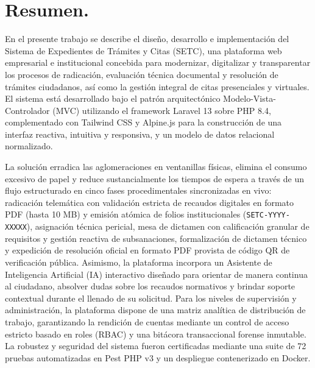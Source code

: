 \section*{Resumen.}

En el presente trabajo se describe el diseño, desarrollo e implementación del Sistema de Expedientes de Trámites y Citas (SETC), una plataforma web empresarial e institucional concebida para modernizar, digitalizar y transparentar los procesos de radicación, evaluación técnica documental y resolución de trámites ciudadanos, así como la gestión integral de citas presenciales y virtuales. El sistema está desarrollado bajo el patrón arquitectónico Modelo-Vista-Controlador (MVC) utilizando el framework Laravel 13 sobre PHP 8.4, complementado con Tailwind CSS y Alpine.js para la construcción de una interfaz reactiva, intuitiva y responsiva, y un modelo de datos relacional normalizado.

La solución erradica las aglomeraciones en ventanillas físicas, elimina el consumo excesivo de papel y reduce sustancialmente los tiempos de espera a través de un flujo estructurado en cinco fases procedimentales sincronizadas en vivo: radicación telemática con validación estricta de recaudos digitales en formato PDF (hasta 10 MB) y emisión atómica de folios institucionales (\texttt{SETC-YYYY-XXXXX}), asignación técnica pericial, mesa de dictamen con calificación granular de requisitos y gestión reactiva de subsanaciones, formalización de dictamen técnico y expedición de resolución oficial en formato PDF provista de código QR de verificación pública. Asimismo, la plataforma incorpora un Asistente de Inteligencia Artificial (IA) interactivo diseñado para orientar de manera continua al ciudadano, absolver dudas sobre los recaudos normativos y brindar soporte contextual durante el llenado de su solicitud. Para los niveles de supervisión y administración, la plataforma dispone de una matriz analítica de distribución de trabajo, garantizando la rendición de cuentas mediante un control de acceso estricto basado en roles (RBAC) y una bitácora transaccional forense inmutable. La robustez y seguridad del sistema fueron certificadas mediante una suite de 72 pruebas automatizadas en Pest PHP v3 y un despliegue contenerizado en Docker.
